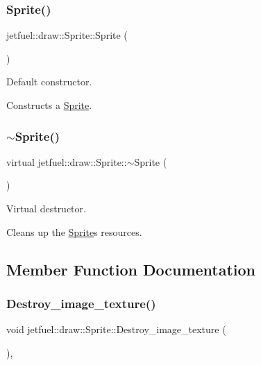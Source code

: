 \subsubsection{\texorpdfstring{Sprite()}{Sprite()}}
{\footnotesize\ttfamily jetfuel\+::draw\+::\+Sprite\+::\+Sprite (\begin{DoxyParamCaption}{ }\end{DoxyParamCaption})}



Default constructor. 

Constructs a \hyperlink{classjetfuel_1_1draw_1_1Sprite}{Sprite}. \mbox{\label{classjetfuel_1_1draw_1_1Sprite_ac13ffb7365f120f4e679ed547ea704cd}} 
\subsubsection{\texorpdfstring{$\sim$\+Sprite()}{~Sprite()}}
{\footnotesize\ttfamily virtual jetfuel\+::draw\+::\+Sprite\+::$\sim$\+Sprite (\begin{DoxyParamCaption}{ }\end{DoxyParamCaption})\hspace{0.3cm}{\ttfamily [virtual]}}



Virtual destructor. 

Cleans up the \hyperlink{classjetfuel_1_1draw_1_1Sprite}{Sprite}\textquotesingle{}s resources. 

\subsection{Member Function Documentation}
\mbox{\label{classjetfuel_1_1draw_1_1Sprite_ad429e62219ac70a4285cc938f7f06800}} 
\subsubsection{\texorpdfstring{Destroy\+\_\+image\+\_\+texture()}{Destroy\_image\_texture()}}
{\footnotesize\ttfamily void jetfuel\+::draw\+::\+Sprite\+::\+Destroy\+\_\+image\+\_\+texture (\begin{DoxyParamCaption}{ }\end{DoxyParamCaption})\hspace{0.3cm}{\ttfamily [inline]}, {\ttfamily [protected]}}



